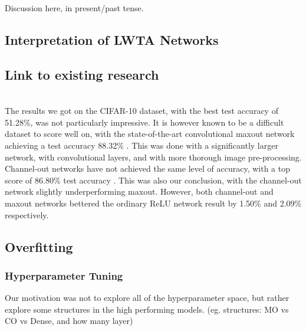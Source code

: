 Discussion here, in present/past tense.

\subsection{Interpretation of LWTA Networks}


\subsection{Link to existing research}
     \\
    The results we got on the CIFAR-10 dataset, with the best test accuracy of 51.28\%, was not particularly impressive. It is however known to be a difficult dataset to score well on, with the state-of-the-art convolutional maxout network achieving a test accuracy 88.32\% \citep{Maxout_Networks}. This was done with a significantly larger network, with convolutional layers, and with more thorough image pre-processing. Channel-out networks have not achieved the same level of accuracy, with a top score of 86.80\% test accuracy \citep{Wang}. This was also our conclusion, with the channel-out network slightly underperforming maxout. However, both channel-out and maxout networks bettered the ordinary ReLU network result by 1.50\% and 2.09\% respectively.



\subsection{Overfitting}


\subsubsection{Hyperparameter Tuning}
    Our motivation was not to explore all of the hyperparameter space, but rather explore some structures in the high performing models. (eg. structures: MO vs CO vs Dense, and how many layer)
     \\
     \\

